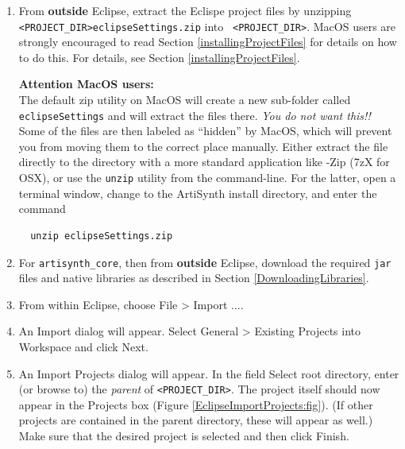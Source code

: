 \begin{enumerate}

\item From {\bf outside} Eclipse, extract the Eclispe project files by
unzipping {\tt <PROJECT\_DIR>\SEP eclipse\-Settings.zip} into {\tt
<PROJECT\_DIR>}.
\ifMacOS
MacOS users are strongly encouraged to read  
Section \ref{installingProjectFiles} for details on how to do this.
\else
For details, see Section \ref{installingProjectFiles}.
\fi

\ifMacOS
\begin{sideblock}
{\bf Attention MacOS users:}\\[0.5em]
The default zip utility on MacOS will create a new sub-folder called 
{\tt eclipseSettings} and will extract the files there.  
\emph{You do not want this!!}
Some of the files are then labeled as ``hidden'' by MacOS, which will
prevent you from moving them to the correct place manually. 
Either extract the file directly to the \ArtHome[] directory 
with a more standard application like {-Zip} ({\sf 7zX} for OSX), 
or use the {\tt unzip} utility from the command-line.  For the latter,
open a terminal window, change to the ArtiSynth install directory,
and enter the command
\begin{verbatim}
  unzip eclipseSettings.zip
\end{verbatim}
\end{sideblock}
\fi

\item For {\tt artisynth\_core}, then from {\bf outside} Eclipse, 
download the required {\tt jar} files and native libraries as
described in Section \ref{DownloadingLibraries}.

\item From within Eclipse, choose {\sf File > Import ...}.

\item An {\sf Import} dialog will appear. 
Select {\sf General > Existing Projects into Workspace} and click {\sf Next}.

\item An {\sf Import Projects} dialog will appear. 
In the field {\sf Select root directory}, enter (or browse to) the
{\it parent} \directory{} of {\tt <PROJECT\_DIR>}. The project
itself should now appear in the {\sf Projects} box (Figure
\ref{EclipseImportProjects:fig}). (If other projects are contained in the 
parent directory, these will appear as well.)
Make sure that the
desired project is selected and then click {\sf Finish}.

\end{enumerate}


